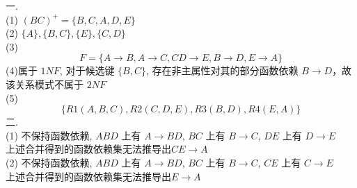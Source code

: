 \documentclass{article}
\begin{document}
一.\\
(1) $(BC)^+ = \{B, C, A, D, E\}$ \\
(2) $\{A\}, \{B, C\}, \{E\}, \{C, D\}$ \\
(3) 
\[
    F = \{A \to B, A \to C, CD \to E, B \to D, E \to A\}
\]
(4)属于 $1NF$, 对于候选键 $\{B, C\}$, 存在非主属性对其的部分函数依赖 $B \to D$，故
该关系模式不属于 $2NF$\\
(5) 
\[
    \{R1(A, B, C), R2(C, D, E), R3(B, D), R4(E, A)\}
\]
二.\\
(1) 不保持函数依赖,
$ABD$ 上有 $A \to BD$, $BC$ 上有 $B \to C$, $DE$ 上有 $D \to E$ \\
上述合并得到的函数依赖集无法推导出$CE \to A$ \\
(2) 不保持函数依赖,
$ABD$ 上有 $A \to BD$, $BC$ 上有 $B \to C$, $CE$ 上有 $C \to E$ \\
上述合并得到的函数依赖集无法推导出$E \to A$
\end{document}
